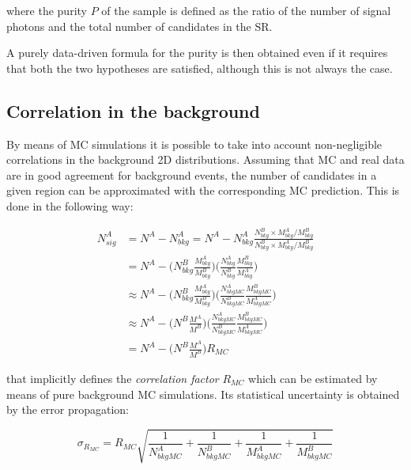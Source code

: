 \documentclass[11pt,a4paper,twoside,openright]{book}
\begin{document}
where the purity $P$ of the sample is defined as the ratio of the number of signal photons and the total number of candidates in the SR.

A purely data-driven formula for the purity is then obtained even if it requires that both the two hypotheses are satisfied, although this is not always the case.


\subsection{Correlation in the background}

By means of MC simulations it is possible to take into account non-negligible correlations in the background 2D distributions. Assuming that MC and real data are in good agreement for background events, the number of candidates in a given region can be approximated with the corresponding MC prediction. This is done in the following way:

\begin{equation} \label{eq:eq1}
\begin{aligned}
    N^{A}_{sig} & = N^{A} - N^{A}_{bkg} = N^{A} - N^{A}_{bkg} \frac{N^{B}_{bkg} \times M^{A}_{bkg}/M^{B}_{bkg}}{N^{B}_{bkg} \times M^{A}_{bkg}/M^{B}_{bkg}} \\
    & = N^{A} - \biggl( N^{B}_{bkg} \frac{M^{A}_{bkg}}{M^{B}_{bkg}} \biggr) \biggl( \frac{N^{A}_{bkg}}{N^{B}_{bkg}} \frac{M^{B}_{bkg}}{M^{A}_{bkg}} \biggr) \\
    & \approx N^{A} - \biggl( N^{B}_{bkg} \frac{M^{A}_{bkg}}{M^{B}_{bkg}} \biggr) \biggl( \frac{N^{A}_{bkgMC}}{N^{B}_{bkgMC}} \frac{M^{B}_{bkgMC}}{M^{A}_{bkgMC}} \biggr) \\
    & \approx N^{A} - \biggl( N^{B} \frac{M^{A}}{M^{B}} \biggr) \biggl( \frac{N^{A}_{bkgMC}}{N^{B}_{bkgMC}} \frac{M^{B}_{bkgMC}}{M^{A}_{bkgMC}} \biggr) \\
    & = N^{A} - \biggl( N^{B} \frac{M^{A}}{M^{B}} \biggr) R_{MC}
\end{aligned}
\end{equation} 

that implicitly defines the \textit{correlation factor} $R_{MC}$ which can be estimated by means of pure background MC simulations. Its statistical uncertainty is obtained by the error propagation:

\begin{equation}
    \sigma_{R_{MC}} = R_{MC} \sqrt{\frac{1}{N^{A}_{bkgMC}} + \frac{1}{N^{B}_{bkgMC}} + \frac{1}{M^{A}_{bkgMC}} + \frac{1}{M^{B}_{bkgMC}}}
\end{equation}
\end{document}
